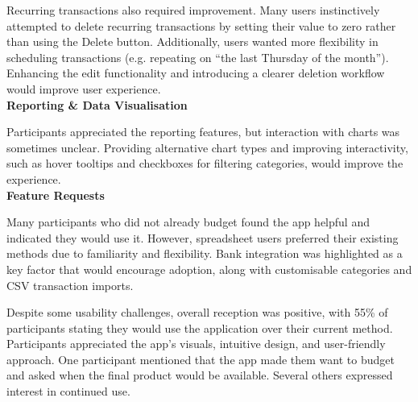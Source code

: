 \documentclass{l4proj}
\begin{document}
Recurring transactions also required improvement. Many users instinctively attempted to delete recurring transactions by setting their value to zero rather than using the Delete button. Additionally, users wanted more flexibility in scheduling transactions (e.g. repeating on “the last Thursday of the month”). Enhancing the edit functionality and introducing a clearer deletion workflow would improve user experience.  \\

\textbf{Reporting \& Data Visualisation}

Participants appreciated the reporting features, but interaction with charts was sometimes unclear. Providing alternative chart types and improving interactivity, such as hover tooltips and checkboxes for filtering categories, would improve the experience. \\

\textbf{Feature Requests}

Many participants who did not already budget found the app helpful and indicated they would use it. However, spreadsheet users preferred their existing methods due to familiarity and flexibility. Bank integration was highlighted as a key factor that would encourage adoption, along with customisable categories and CSV transaction imports.  

Despite some usability challenges, overall reception was positive, with 55\% of participants stating they would use the application over their current method. Participants appreciated the app’s visuals, intuitive design, and user-friendly approach. One participant mentioned that the app made them want to budget and asked when the final product would be available. Several others expressed interest in continued use. 
\end{document}
